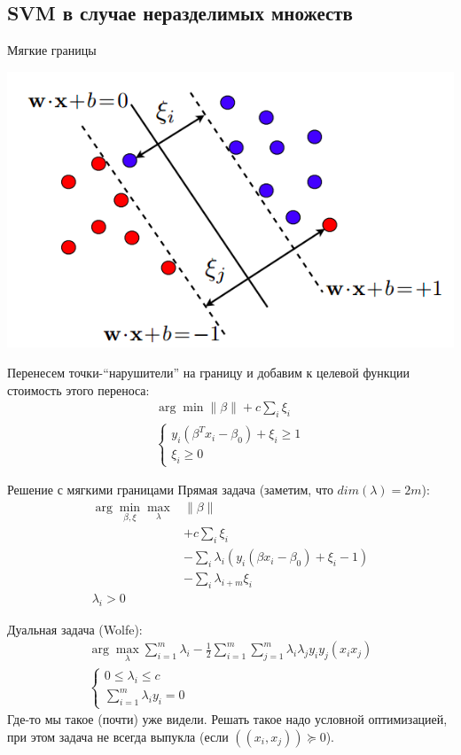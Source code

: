 \documentclass[14pt, fleqn, xcolor={dvipsnames, table}]{beamer}
\begin{document}
\subsection{SVM в случае неразделимых множеств} %

\begin{frame}{Мягкие границы}
\begin{center}
\includegraphics[height=0.4\textheight]{SoftMargins.png}
\end{center}
Перенесем точки-``нарушители'' на границу и добавим к целевой функции стоимость этого переноса:
$$\begin{array}{l}
\arg \min \|\beta\| + c\sum_i \xi_i \\
\left\{\begin{array}{l}
y_i(\beta^T x_i - \beta_0) + \xi_i \ge 1 \\
\xi_i \ge 0
\end{array}\right.
\end{array}$$
\end{frame}

\begin{frame}{Решение с мягкими границами}
\small
Прямая задача (заметим, что $dim(\lambda) = 2 m$):
$$\begin{array}{ll}
\arg \min_{\beta,\xi} \max_{\lambda} & \|\beta\| \\
  & + c\sum_i \xi_i \\
  & - \sum_i \lambda_{i} \left(y_i (\beta x_i - \beta_0) + \xi_i - 1\right) \\
  & - \sum_i \lambda_{i+m} \xi_i \\
\lambda_i > 0
\end{array}$$

Дуальная задача (Wolfe):
$$
\begin{array}{l}  
\arg \max_{\lambda} \sum_{i=1}^m\lambda_i - \frac{1}{2}\sum_{i=1}^m\sum_{j=1}^m\lambda_i\lambda_j y_i y_j (x_i x_j) \\  

\left\{\begin{array}{ll}  
  0 \le \lambda_i \le c & \\
  \sum_{i=1}^m\lambda_i y_i = 0
  \end{array}   
\right.
\end{array}
$$
Где-то мы такое (почти) уже видели. Решать такое надо условной оптимизацией, при этом задача не всегда выпукла (если $((x_i,x_j)) \succeq 0$).
\end{frame}
\end{document}
